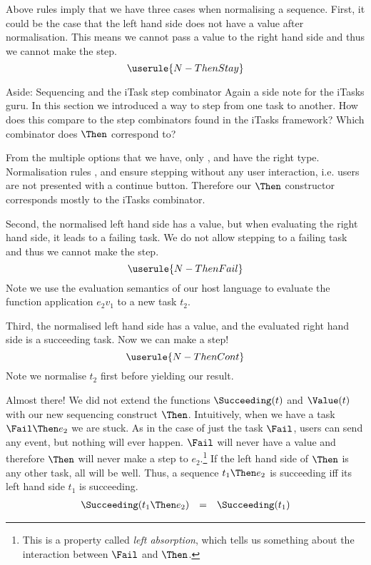 Above rules imply that we have three cases when normalising a sequence.
First,
it could be the case that the left hand side does not have a value after normalisation.
This means we cannot pass a value to the right hand side
and thus we cannot make the step.
\begin{equation*}
  \userule{N-ThenStay}
\end{equation*}

\begin{margintext}{Aside: Sequencing and the iTask step combinator}
  Again a side note for the iTasks guru.
  In this section we introduced a way to step from one task to another.
  How does this compare to the step combinators found in the iTasks framework?
  Which combinator does $\Then$ correspond to?

  From the multiple options that we have,
  only \type{(>>=)}, \type{(>>-)} and \type{(>>\texttilde)} have the right type.
  Normalisation rules ,  and  ensure stepping without any user interaction,
  i.e. users are not presented with a continue button.
  Therefore our $\Then$ constructor corresponds mostly to the iTasks \type{(>>-)} combinator.
\end{margintext}

Second,
the normalised left hand side has a value,
but when evaluating the right hand side,
it leads to a failing task.
We do not allow stepping to a failing task
and thus we cannot make the step.
\begin{equation*}
  \userule{N-ThenFail}
\end{equation*}
Note we use the evaluation semantics of our host language
to evaluate the function application $e_2 v_1$ to a new task $t_2$.

Third,
the normalised left hand side has a value,
and the evaluated right hand side is a succeeding task.
Now we can make a step!
\begin{equation*}
  \userule{N-ThenCont}
\end{equation*}
Note we normalise $t_2$ first before yielding our result.

Almost there!
We did not extend the functions $\Succeeding(t)$ and $\Value(t)$ with our new sequencing construct $\Then$.
Intuitively,
when we have a task $\Fail \Then e_2$ we are stuck.
As in the case of just the task $\Fail$,
users can send any event,
but nothing will ever happen.
$\Fail$ will never have a value
and therefore $\Then$ will never make a step to $e_2$.\footnote{
  This is a property called \emph{left absorption},
  which tells us something about the interaction between $\Fail$ and $\Then$.
}
If the left hand side of $\Then$ is any other task,
all will be well.
Thus,
a sequence $t_1 \Then e_2$ is succeeding iff its left hand side $t_1$ is succeeding.
\begin{equation*}
  \begin{array}{lcl}
    \Succeeding(t_1 \Then e_2) &=& \Succeeding(t_1)
  \end{array}
\end{equation*}

